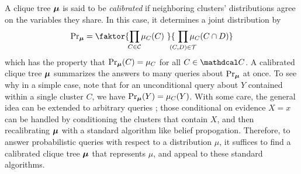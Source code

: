\documentclass{article}
\newcommand\discard[1]{}
\begin{document}
A clique tree
$\boldsymbol\mu$ 
is said to be \emph{calibrated} if neighboring clusters' distributions agree on the variables 
they share.
In this case, 
it determines a joint distribution by
\begin{equation}
    \Pr\nolimits_{\bmu} = \faktor
        {\prod_{\mathclap{C \in \cal C}} \mu_C(C)~}
        {~\prod_{\mathclap{(C,D) \in \cal T}} \mu_{C}(C \cap D)}
    \label{eq:cliquedist}
\end{equation}
which has the property that $\Pr_{\boldsymbol\mu}(C) = \mu_C$ for 
all
$C \in \C$.
A calibrated clique tree $\boldsymbol\mu$ summarizes the answers to 
    many 
    queries about $\Pr_{\boldsymbol\mu}$ at once. 
To see why
in a simple case, note that 
for an unconditional query about $Y$ contained within a single cluster $C$, we have
$\Pr_{\boldsymbol\mu}(Y) = \mu_C(Y)$.
\discard{%
    Note also that if $\C = \{ \X \}$ just contains one big cluster, 
    a clique tree is an explicit joint distribution, reducing queries to summation.}%
With some care, the general idea can be extended to arbitrary queries 
    \parencite[see][\S 10.3.3]{koller2009probabilistic};
    those conditional on evidence $X{=}x$ can be handled
    by conditioning the clusters that contain $X$,
    and then recalibrating $\boldsymbol\mu$ with 
    a standard algorithm like belief propogation.
Therefore, to answer probabilistic queries with respect to a distribution $\mu$, it suffices to find a calibrated clique tree $\boldsymbol\mu$ that represents $\mu$, and appeal to these standard algorithms.
\end{document}
